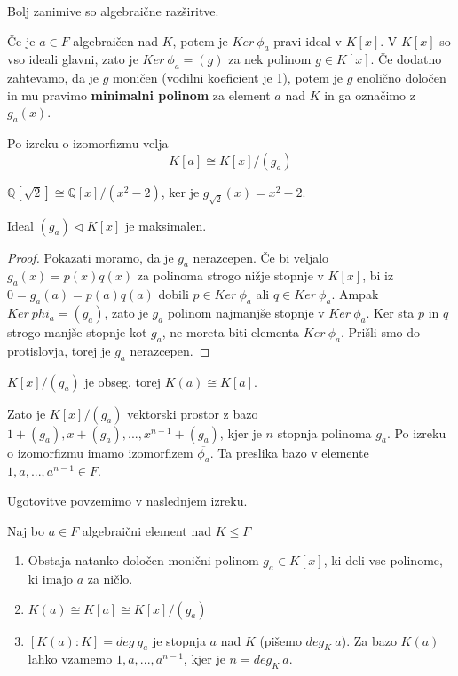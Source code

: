 \documentclass[11pt, a4paper]{article}
\begin{document}
    Bolj zanimive so algebraične razširitve.
    \par
    Če je \(a \in F\) algebraičen nad \(K\), potem je \(Ker\ \phi_a\) pravi ideal v \(K[x]\). V \(K[x]\) so vso ideali glavni, zato je \(Ker\ \phi_a = (g)\) za nek polinom \(g \in K[x]\). Če dodatno zahtevamo, da je \(g\) moničen (vodilni koeficient je 1), potem je \(g\) enolično določen in mu pravimo \textbf{minimalni polinom} za element \(a\) nad \(K\) in ga označimo z \(g_a(x)\).

    \par
    Po izreku o izomorfizmu velja
    \[K[a] \cong K[x] / (g_a)\]

    \begin{example}
        \(\mathbb{Q}[\sqrt{2}] \cong \mathbb{Q}[x] / (x^2-2)\), ker je \(g_{\sqrt{2}}(x) = x^2-2\).
    \end{example}

    \begin{lemma}
        Ideal \((g_a) \triangleleft K[x]\) je maksimalen.
    \end{lemma}

    \begin{proof}
        Pokazati moramo, da je \(g_a\) nerazcepen. Če bi veljalo \(g_a(x) = p(x) q(x)\) za polinoma strogo nižje stopnje v \(K[x]\), bi iz \(0 = g_a(a) = p(a) q(a)\) dobili \(p \in Ker\ \phi_a\) ali \(q \in Ker\ \phi_a\). Ampak \(Ker\ phi_a = (g_a)\), zato je \(g_a\) polinom najmanjše stopnje v \(Ker\ \phi_a\). Ker sta \(p\) in \(q\) strogo manjše stopnje kot \(g_a\), ne moreta biti elementa \(Ker\ \phi_a\). Prišli smo do protislovja, torej je \(g_a\) nerazcepen. 
    \end{proof}

    \begin{corollary}
        \(K[x] / (g_a)\) je obseg, torej \(K(a) \cong K[a]\).
    \end{corollary}

    Zato je \(K[x] / (g_a)\) vektorski prostor z bazo \(1 + (g_a), x + (g_a),..., x^{n-1} + (g_a)\), kjer je \(n\) stopnja polinoma \(g_a\). Po izreku o izomorfizmu imamo izomorfizem \(\overline{\phi_a}\). Ta preslika bazo v elemente \(1,a,...,a^{n-1} \in F\).

    \par
    Ugotovitve povzemimo v naslednjem izreku.

    \begin{theorem}
        Naj bo \(a \in F\) algebraični element nad \(K \le F\)
        \begin{enumerate}[label=\alph*)]
            \item Obstaja natanko določen monični polinom \(g_a \in K[x]\), ki deli vse polinome, ki imajo \(a\) za ničlo.
            \item \(K(a) \cong K[a] \cong K[x] / (g_a)\)
            \item \([K(a) : K] = deg\ g_a\) je stopnja \(a\) nad \(K\) (pišemo \(deg_{K}\ a\)). Za bazo \(K(a)\) lahko vzamemo \(1,a,...,a^{n-1}\), kjer je \(n = deg_{K}\ a\).
        \end{enumerate}    
    \end{theorem}
\end{document}
